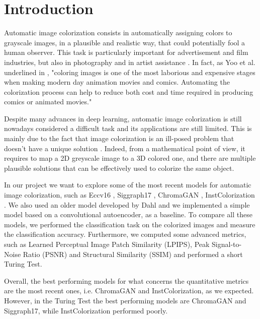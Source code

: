 \section{Introduction}
Automatic image colorization consists in automatically assigning colors to grayscale images, in a plausible and
realistic way, that could potentially fool a human observer. This task is particularly important for advertisement
and film industries, but also in photography and in artist assistance \cite{chromagan}.
In fact, as Yoo et al. underlined in \cite{animation}, "coloring images is one of the most laborious and expensive
stages when making modern day animation movies and comics. Automating the colorization process can help to reduce
both cost and time required in producing comics or animated movies."

Despite many advances in deep learning, automatic image colorization is still nowadays considered a difficult task
and its applications are still limited. This is mainly due to the fact that image colorization is an ill-posed
problem that doesn't have a unique solution \cite{su} \cite{chromagan}. Indeed, from a mathematical point of view,
it requires to map a 2D greyscale image to a 3D colored one, and there are multiple plausible solutions that can
be effectively used to colorize the same object.

In our project we want to explore some of the most recent models for automatic image colorization, such as
Eccv16 \cite{zhang}, Siggraph17 \cite{siggraph}, ChromaGAN \cite{chromagan}, InstColorization \cite{su}.
We also used an older model developed by Dahl \cite{dahl} and we implemented a simple model based on a
convolutional autoencoder, as a baseline.
To compare all these models, we performed the classification task on the colorized images and measure the
classification accuracy. Furthermore, we computed some advanced metrics, such as Learned Perceptual Image Patch
Similarity (LPIPS), Peak Signal-to-Noise Ratio (PSNR) and Structural Similarity (SSIM) and performed a short
Turing Test.

Overall, the best performing models for what concerns the quantitative metrics are the most recent ones,
i.e. ChromaGAN and InstColorization, as we expected. However, in the Turing Test the best performing models
are ChromaGAN and Siggraph17, while InstColorization performed poorly.




